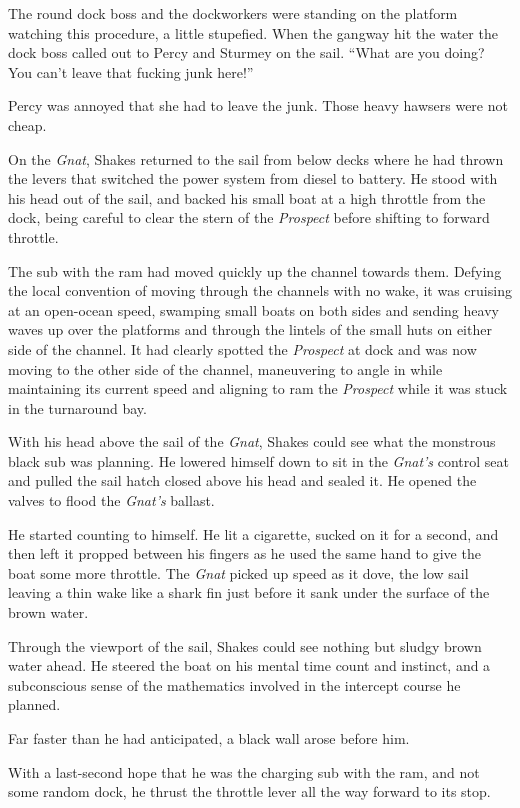 \documentclass[
]{scrbook}
\begin{document}
The round dock boss and the dockworkers were standing on the platform
watching this procedure, a little stupefied. When the gangway hit the
water the dock boss called out to Percy and Sturmey on the sail. ``What
are you doing? You can't leave that fucking junk here!''

Percy was annoyed that she had to leave the junk. Those heavy hawsers
were not cheap.

On the \emph{Gnat}, Shakes returned to the sail from below decks where
he had thrown the levers that switched the power system from diesel to
battery. He stood with his head out of the sail, and backed his small
boat at a high throttle from the dock, being careful to clear the stern
of the \emph{Prospect} before shifting to forward throttle.

The sub with the ram had moved quickly up the channel towards them.
Defying the local convention of moving through the channels with no
wake, it was cruising at an open-ocean speed, swamping small boats on
both sides and sending heavy waves up over the platforms and through the
lintels of the small huts on either side of the channel. It had clearly
spotted the \emph{Prospect} at dock and was now moving to the other side
of the channel, maneuvering to angle in while maintaining its current
speed and aligning to ram the \emph{Prospect} while it was stuck in the
turnaround bay.

With his head above the sail of the \emph{Gnat}, Shakes could see what
the monstrous black sub was planning. He lowered himself down to sit in
the \emph{Gnat's} control seat and pulled the sail hatch closed above
his head and sealed it. He opened the valves to flood the \emph{Gnat's}
ballast.

He started counting to himself. He lit a cigarette, sucked on it for a
second, and then left it propped between his fingers as he used the same
hand to give the boat some more throttle. The \emph{Gnat} picked up
speed as it dove, the low sail leaving a thin wake like a shark fin just
before it sank under the surface of the brown water.

Through the viewport of the sail, Shakes could see nothing but sludgy
brown water ahead. He steered the boat on his mental time count and
instinct, and a subconscious sense of the mathematics involved in the
intercept course he planned.

Far faster than he had anticipated, a black wall arose before him.

With a last-second hope that he was the charging sub with the ram, and
not some random dock, he thrust the throttle lever all the way forward
to its stop.
\end{document}
